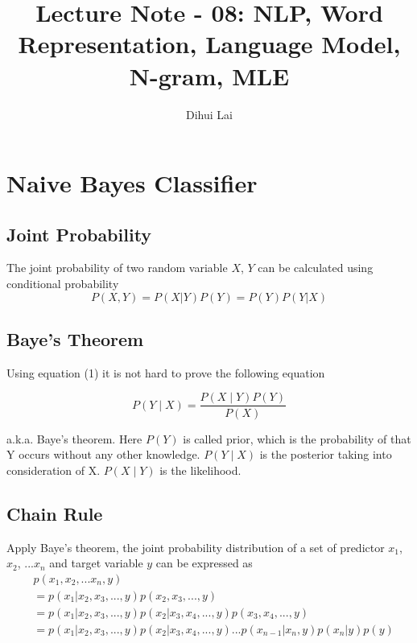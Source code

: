 \documentclass[12pt, oneside]{article}
\title{Lecture Note - 08: NLP, Word Representation, Language Model, N-gram, MLE}
\author{Dihui Lai}
\begin{document}
\maketitle
\tableofcontents

\vspace{.25in}

\section{Naive Bayes Classifier}

\subsection{Joint Probability }
The joint probability of two random variable $X$, $Y$ can be calculated using conditional probability 
\begin{equation}
P(X, Y)=P(X|Y)P(Y)=P(Y)P(Y|X)
\end{equation}

\subsection{Baye's Theorem}
Using equation (1) it is not hard to prove the following equation

\begin{equation}
P(Y\mid X)=\frac {P(X\mid Y)P(Y)}{P(X)}
\end{equation}

a.k.a. Baye's theorem. Here $P(Y)$ is called prior, which is the probability of that Y occurs without any other knowledge. $P(Y\mid X)$ is the posterior taking into consideration of X. $P(X\mid Y)$ is the likelihood.

\subsection{Chain Rule}
Apply Baye's theorem, the joint probability distribution of a set of predictor $x_1$, $x_2$, ...$x_n$ and target variable $y$ can be expressed as 
\begin{align*}
&p(x_1, x_2, ...x_n, y)\\
&=p(x_1|x_2, x_3, ..., y)p(x_2, x_3, ..., y)\\
&=p(x_1|x_2, x_3, ..., y)p(x_2|x_3, x_4, ..., y)p(x_3, x_4, ..., y)\\
&=p(x_1|x_2, x_3, ..., y)p(x_2|x_3, x_4, ..., y)...p(x_{n-1}|x_n, y)p(x_n|y)p(y)
\end{align*}
\end{document}
